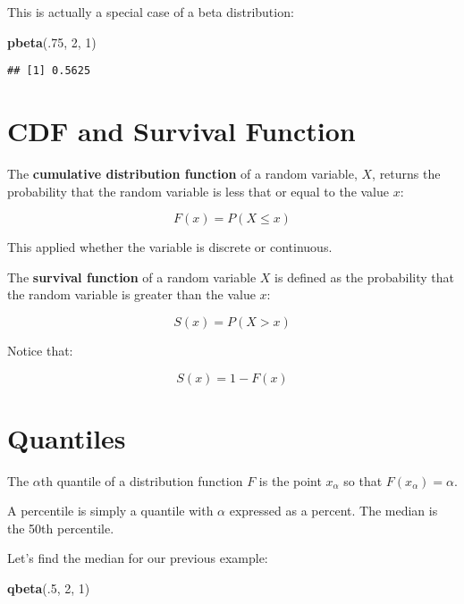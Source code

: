 \documentclass[]{article}
\newenvironment{Shaded}{\begin{snugshade}}{\end{snugshade}}
\newcommand{\DecValTok}[1]{\textcolor[rgb]{0.00,0.00,0.81}{#1}}
\newcommand{\KeywordTok}[1]{\textcolor[rgb]{0.13,0.29,0.53}{\textbf{#1}}}
\newcommand{\NormalTok}[1]{#1}
\begin{document}
This is actually a special case of a beta distribution:

\begin{Shaded}
\begin{Highlighting}[]
\KeywordTok{pbeta}\NormalTok{(.}\DecValTok{75}\NormalTok{, }\DecValTok{2}\NormalTok{, }\DecValTok{1}\NormalTok{)}
\end{Highlighting}
\end{Shaded}

\begin{verbatim}
## [1] 0.5625
\end{verbatim}

\hypertarget{cdf-and-survival-function}{%
\section{CDF and Survival Function}\label{cdf-and-survival-function}}

The \textbf{cumulative distribution function} of a random variable,
\(X\), returns the probability that the random variable is less that or
equal to the value \(x\):

\[ F(x) = P(X \le x) \]

This applied whether the variable is discrete or continuous.

The \textbf{survival function} of a random variable \(X\) is defined as
the probability that the random variable is greater than the value
\(x\):

\[ S(x) = P(X > x) \]

Notice that:

\[ S(x) = 1 - F(x) \]

\hypertarget{quantiles}{%
\section{Quantiles}\label{quantiles}}

The \(\alpha\)th quantile of a distribution function \(F\) is the point
\(x_\alpha\) so that \(F(x_\alpha) = \alpha\).

A percentile is simply a quantile with \(\alpha\) expressed as a
percent. The median is the 50th percentile.

Let's find the median for our previous example:

\begin{Shaded}
\begin{Highlighting}[]
\KeywordTok{qbeta}\NormalTok{(.}\DecValTok{5}\NormalTok{, }\DecValTok{2}\NormalTok{, }\DecValTok{1}\NormalTok{)}
\end{Highlighting}
\end{Shaded}
\end{document}
